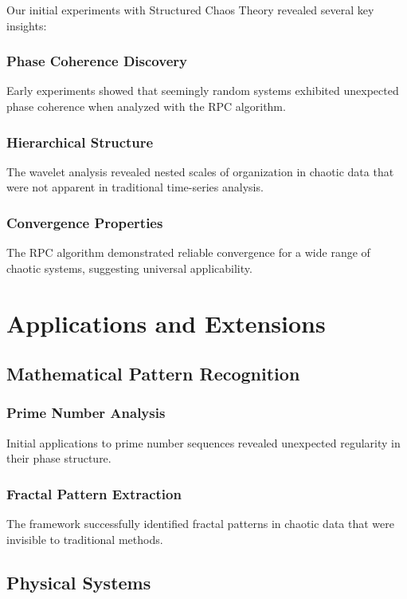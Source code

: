 \documentclass[12pt]{article}
\begin{document}
Our initial experiments with Structured Chaos Theory revealed several key insights:

\subsubsection{Phase Coherence Discovery}
Early experiments showed that seemingly random systems exhibited unexpected phase coherence when analyzed with the RPC algorithm.

\subsubsection{Hierarchical Structure}
The wavelet analysis revealed nested scales of organization in chaotic data that were not apparent in traditional time-series analysis.

\subsubsection{Convergence Properties}
The RPC algorithm demonstrated reliable convergence for a wide range of chaotic systems, suggesting universal applicability.

\section{Applications and Extensions}

\subsection{Mathematical Pattern Recognition}

\subsubsection{Prime Number Analysis}
Initial applications to prime number sequences revealed unexpected regularity in their phase structure.

\subsubsection{Fractal Pattern Extraction}
The framework successfully identified fractal patterns in chaotic data that were invisible to traditional methods.

\subsection{Physical Systems}
\end{document}

